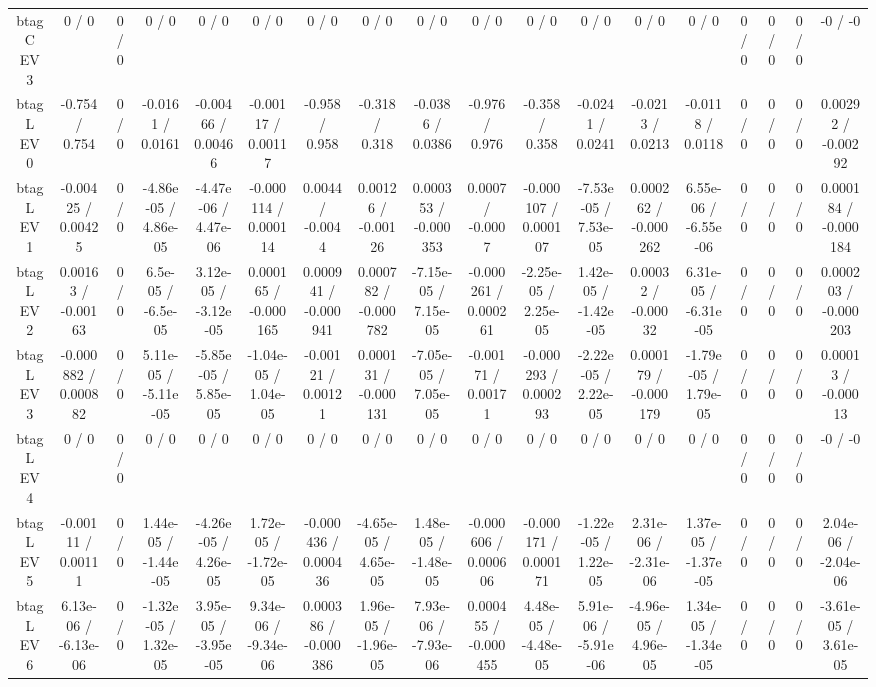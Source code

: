 \documentclass[10pt]{article}
\begin{document}
\begin{table}[htbp]
\begin{center}
\begin{tabular}{|c|c|c|c|c|c|c|c|c|c|c|c|c|c|c|c|c|c|}
  btag C EV 3 & 0 / 0 & 0 / 0 & 0 / 0 & 0 / 0 & 0 / 0 & 0 / 0 & 0 / 0 & 0 / 0 & 0 / 0 & 0 / 0 & 0 / 0 & 0 / 0 & 0 / 0 & 0 / 0 & 0 / 0 & 0 / 0 & -0 / -0 \\ 
  btag L EV 0 & -0.754 / 0.754 & 0 / 0 & -0.0161 / 0.0161 & -0.00466 / 0.00466 & -0.00117 / 0.00117 & -0.958 / 0.958 & -0.318 / 0.318 & -0.0386 / 0.0386 & -0.976 / 0.976 & -0.358 / 0.358 & -0.0241 / 0.0241 & -0.0213 / 0.0213 & -0.0118 / 0.0118 & 0 / 0 & 0 / 0 & 0 / 0 & 0.00292 / -0.00292 \\ 
  btag L EV 1 & -0.00425 / 0.00425 & 0 / 0 & -4.86e-05 / 4.86e-05 & -4.47e-06 / 4.47e-06 & -0.000114 / 0.000114 & 0.0044 / -0.0044 & 0.00126 / -0.00126 & 0.000353 / -0.000353 & 0.0007 / -0.0007 & -0.000107 / 0.000107 & -7.53e-05 / 7.53e-05 & 0.000262 / -0.000262 & 6.55e-06 / -6.55e-06 & 0 / 0 & 0 / 0 & 0 / 0 & 0.000184 / -0.000184 \\ 
  btag L EV 2 & 0.00163 / -0.00163 & 0 / 0 & 6.5e-05 / -6.5e-05 & 3.12e-05 / -3.12e-05 & 0.000165 / -0.000165 & 0.000941 / -0.000941 & 0.000782 / -0.000782 & -7.15e-05 / 7.15e-05 & -0.000261 / 0.000261 & -2.25e-05 / 2.25e-05 & 1.42e-05 / -1.42e-05 & 0.00032 / -0.00032 & 6.31e-05 / -6.31e-05 & 0 / 0 & 0 / 0 & 0 / 0 & 0.000203 / -0.000203 \\ 
  btag L EV 3 & -0.000882 / 0.000882 & 0 / 0 & 5.11e-05 / -5.11e-05 & -5.85e-05 / 5.85e-05 & -1.04e-05 / 1.04e-05 & -0.00121 / 0.00121 & 0.000131 / -0.000131 & -7.05e-05 / 7.05e-05 & -0.00171 / 0.00171 & -0.000293 / 0.000293 & -2.22e-05 / 2.22e-05 & 0.000179 / -0.000179 & -1.79e-05 / 1.79e-05 & 0 / 0 & 0 / 0 & 0 / 0 & 0.00013 / -0.00013 \\ 
  btag L EV 4 & 0 / 0 & 0 / 0 & 0 / 0 & 0 / 0 & 0 / 0 & 0 / 0 & 0 / 0 & 0 / 0 & 0 / 0 & 0 / 0 & 0 / 0 & 0 / 0 & 0 / 0 & 0 / 0 & 0 / 0 & 0 / 0 & -0 / -0 \\ 
  btag L EV 5 & -0.00111 / 0.00111 & 0 / 0 & 1.44e-05 / -1.44e-05 & -4.26e-05 / 4.26e-05 & 1.72e-05 / -1.72e-05 & -0.000436 / 0.000436 & -4.65e-05 / 4.65e-05 & 1.48e-05 / -1.48e-05 & -0.000606 / 0.000606 & -0.000171 / 0.000171 & -1.22e-05 / 1.22e-05 & 2.31e-06 / -2.31e-06 & 1.37e-05 / -1.37e-05 & 0 / 0 & 0 / 0 & 0 / 0 & 2.04e-06 / -2.04e-06 \\ 
  btag L EV 6 & 6.13e-06 / -6.13e-06 & 0 / 0 & -1.32e-05 / 1.32e-05 & 3.95e-05 / -3.95e-05 & 9.34e-06 / -9.34e-06 & 0.000386 / -0.000386 & 1.96e-05 / -1.96e-05 & 7.93e-06 / -7.93e-06 & 0.000455 / -0.000455 & 4.48e-05 / -4.48e-05 & 5.91e-06 / -5.91e-06 & -4.96e-05 / 4.96e-05 & 1.34e-05 / -1.34e-05 & 0 / 0 & 0 / 0 & 0 / 0 & -3.61e-05 / 3.61e-05 \\ 

\end{tabular}
\end{center}
\end{table}
\end{document}
